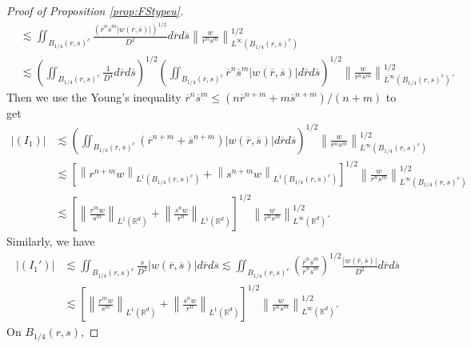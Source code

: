 \documentclass[11pt]{amsart}
\theoremstyle{definition}
\theoremstyle{remark}
\numberwithin{equation}{section}
\numberwithin{equation}{section}
\newcommand{\nrm}[1]{\Vert#1\Vert}
\newcommand{\br}[1]{\overline{#1}}
\newcommand{\0}{\emptyset}
\newcommand{\ift}{\infty}
\newcommand{\bbR}{\mathbb R}
\begin{document}
\begin{proof}[Proof of Proposition \ref{prop:FStypeu}]
\begin{equation}
\begin{aligned}
				&\lesssim \iint_{B_{1/4}(r,s)^{c}}\frac{(\br{r}^{n}\br{s}^{m}|w(\br{r},\br{s})|)^{1/2}}{D^{2}}d\br{r}d\br{s}\left\| \frac{w}{r^{n}s^{m}}\right\|_{L^{\ift}(B_{1/4}(r,s)^{c})}^{1/2}\\
				&\lesssim \left(\iint_{B_{1/4}(r,s)^{c}}\frac{1}{D^{4}}d\br{r}d\br{s}\right)^{1/2}\left(\iint_{B_{1/4}(r,s)^{c}}\br{r}^{n}\br{s}^{m}|w(\br{r},\br{s})|d\br{r}d\br{s}\right)^{1/2}\left\| \frac{w}{r^{n}s^{m}}\right\|_{L^{\ift}(B_{1/4}(r,s)^{c})}^{1/2}.
			\end{aligned}
		\end{equation}
		Then we use the Young's inequality $\br{r}^{n}\br{s}^{m}\leq (n\br{r}^{n+m}+m\br{s}^{n+m})/(n+m)$ to get
		\begin{equation}
			\begin{aligned}
				|(I_{1})|&\lesssim \left(\iint_{B_{1/4}(r,s)^{c}}(\br{r}^{n+m}+\br{s}^{n+m})|w(\br{r},\br{s})|d\br{r}d\br{s}\right)^{1/2}\left\| \frac{w}{r^{n}s^{m}}\right\|_{L^{\ift}(B_{1/4}(r,s)^{c})}^{1/2}\\
				&\lesssim \left[\left\| r^{n+m}w\right\|_{L^{1}(B_{1/4}(r,s)^{c})}+\left\| s^{n+m}w\right\|_{L^{1}(B_{1/4}(r,s)^{c})}\right]^{1/2} \left\| \frac{w}{r^{n}s^{m}}\right\|_{L^{\ift}(B_{1/4}(r,s)^{c})}^{1/2}\\
				&\lesssim %
				\left[\left\| \frac{r^{m}w}{s^{m}}\right\|_{L^{1}(\bbR^{d})}+\left\| \frac{s^{n}w}{r^{n}}\right\|_{L^{1}(\bbR^{d})}\right]^{1/2}\left\| \frac{w}{r^{n}s^{m}}\right\|_{L^{\ift}(\bbR^{d})}^{1/2}.
			\end{aligned}
		\end{equation}
		Similarly, we have
		\begin{equation}
			\begin{aligned}
				|(I_{1}')|&\lesssim \iint_{B_{1/4}(r,s)^{c}}\frac{s}{D^{2}}|w(\br{r},\br{s})|d\br{r}d\br{s}\lesssim \iint_{B_{1/4}(r,s)^{c}}\left(\frac{\br{r}^{n}\br{s}^{m}}{\br{r}^{n}\br{s}^{m}}\right)^{1/2}\frac{|w(\br{r},\br{s})|}{D^{2}}d\br{r}d\br{s}\\
				&\lesssim \left[\left\| \frac{r^{m}w}{s^{m}}\right\|_{L^{1}(\bbR^{d})}+\left\| \frac{s^{n}w}{r^{n}}\right\|_{L^{1}(\bbR^{d})}\right]^{1/2}\left\| \frac{w}{r^{n}s^{m}}\right\|_{L^{\ift}(\bbR^{d})}^{1/2}.
			\end{aligned}
		\end{equation}
		On $ B_{1/4}(r,s) $, %

\end{proof}
\end{document}
